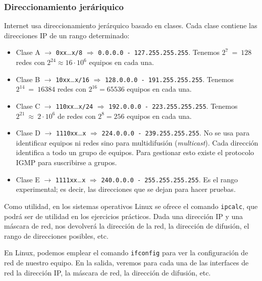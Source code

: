 \subsubsection{Direccionamiento jeráriquico}
\noindent
Internet usa direccionamiento jerárquico basado en clases. Cada clase contiene las direcciones IP de un rango determinado:
\begin{itemize}
    \item Clase A $\rightarrow$ \verb|0xx|\ldots\verb|x/8| $\Longrightarrow $ \verb|0.0.0.0 - 127.255.255.255|. Tenemos $2^7~=~128$ redes con $2^{24} \approx 16\cdot 10^6$ equipos en cada una. 
    \item Clase B $\rightarrow$ \verb|10xx|\ldots\verb|x/16| $\Longrightarrow $ \verb|128.0.0.0 - 191.255.255.255|. Tenemos $2^{14}~=~16384$ redes con $2^{16}=65536$ equipos en cada una. 
    \item Clase C $\rightarrow$ \verb|110xx|\ldots\verb|x/24| $\Longrightarrow $ \verb|192.0.0.0 - 223.255.255.255|. Tenemos $2^{21}~\approx~2\cdot 10^6$ de redes con $2^{8} = 256$ equipos en cada una. 
    \item Clase D $\rightarrow$ \verb|1110xx|\ldots\verb|x| $\Longrightarrow$ \verb|224.0.0.0 - 239.255.255.255|. No se usa para identificar equipos ni redes sino para multidifusión (\textit{multicast}). Cada dirección identifica a todo un grupo de equipos. Para gestionar esto existe el protocolo \acrshort{IGMP} para suscribirse a grupos.
    \item Clase E $\rightarrow$ \verb|1111xx|\ldots\verb|x| $\Longrightarrow $ \verb|240.0.0.0 - 255.255.255.255|. Es el rango experimental; es decir, las direcciones que se dejan para hacer pruebas. 
\end{itemize}

\begin{observacion}
    Como utilidad, en los sistemas operativos Linux se ofrece el comando \verb|ipcalc|, que podrá ser de utilidad en los ejercicios prácticos. Dada una dirección IP y una máscara de red, nos devolverá la dirección de la red, la dirección de difusión, el rango de direcciones posibles, etc.
\end{observacion}
\begin{observacion}
    En Linux, podemos emplear el comando \verb|ifconfig| para ver la configuración de red de nuestro equipo. En la salida, veremos para cada una de las interfaces de red la dirección IP, la máscara de red, la dirección de difusión, etc.
\end{observacion}

